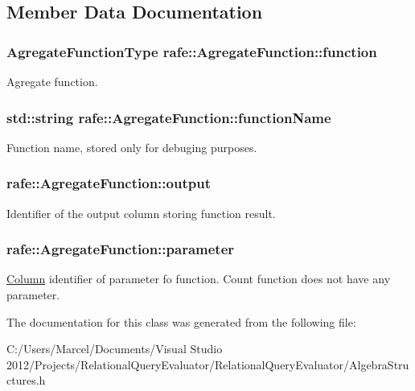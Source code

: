 \subsection{Member Data Documentation}
\hypertarget{classrafe_1_1_agregate_function_a9055ffba2605e99d0ca5362b9b5c7437}{
\subsubsection[{function}]{\setlength{\rightskip}{0pt plus 5cm}Agregate\+Function\+Type rafe\+::\+Agregate\+Function\+::function}}\label{classrafe_1_1_agregate_function_a9055ffba2605e99d0ca5362b9b5c7437}
Agregate function. \hypertarget{classrafe_1_1_agregate_function_a0b3dc806bca42c5ce5525441025166f0}{
\subsubsection[{function\+Name}]{\setlength{\rightskip}{0pt plus 5cm}std\+::string rafe\+::\+Agregate\+Function\+::function\+Name}}\label{classrafe_1_1_agregate_function_a0b3dc806bca42c5ce5525441025166f0}
Function name, stored only for debuging purposes. \hypertarget{classrafe_1_1_agregate_function_ad01da78516417600b5fa40418a5d2cb6}{
\subsubsection[{output}]{ rafe\+::\+Agregate\+Function\+::output}}\label{classrafe_1_1_agregate_function_ad01da78516417600b5fa40418a5d2cb6}
Identifier of the output column storing function result. \hypertarget{classrafe_1_1_agregate_function_ab7cc5507a807035e2a35fbba2fc650d6}{
\subsubsection[{parameter}]{ rafe\+::\+Agregate\+Function\+::parameter}}\label{classrafe_1_1_agregate_function_ab7cc5507a807035e2a35fbba2fc650d6}
\hyperlink{classrafe_1_1_column}{Column} identifier of parameter fo function. Count function does not have any parameter. 

The documentation for this class was generated from the following file\+:\begin{DoxyCompactItemize}
\item 
C\+:/\+Users/\+Marcel/\+Documents/\+Visual Studio 2012/\+Projects/\+Relational\+Query\+Evaluator/\+Relational\+Query\+Evaluator/Algebra\+Structures.\+h\end{DoxyCompactItemize}

